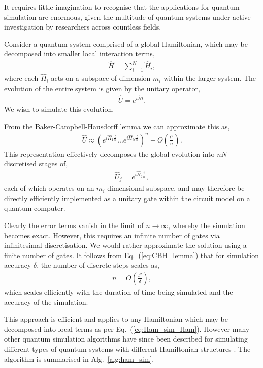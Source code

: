 It requires little imagination to recognise that the applications for quantum simulation are enormous, given the multitude of quantum systems under active investigation by researchers across countless fields.

Consider a quantum system comprised of a global Hamiltonian, which may be decomposed into smaller local interaction terms,
\begin{align} \label{eq:Ham_sim_Ham}
\hat{H} = \sum_{i=1}^N \hat{H}_i	,
\end{align}
where each $\hat{H}_i$ acts on a subspace of dimension $m_i$ within the larger system. The evolution of the entire system is given by the unitary operator,
\begin{align}
\hat{U} = e^{i\hat{H}t}.
\end{align}
We wish to simulate this evolution.

From the Baker-Campbell-Hausdorff lemma we can approximate this as,
\begin{align}\label{eq:CBH_lemma}
	\hat{U} \approx \left(e^{i\hat{H}_1\frac{t}{n}}\dots e^{i\hat{H}_N\frac{t}{n}}\right)^n + O\left(\frac{t^2}{n}\right).
\end{align}
This representation effectively decomposes the global evolution into $nN$ discretised stages of,
\begin{align}
	\hat{U}_j = e^{i\hat{H}_j\frac{t}{n}},
\end{align}
each of which operates on an $m_i$-dimensional subspace, and may therefore be directly efficiently implemented as a unitary gate within the circuit model on a quantum computer. 

Clearly the error terms vanish in the limit of \mbox{$n\to\infty$}, whereby the simulation becomes exact. However, this requires an infinite number of gates via infinitesimal discretisation. We would rather approximate the solution using a finite number of gates. It follows from Eq.~(\ref{eq:CBH_lemma}) that for simulation accuracy $\delta$, the number of discrete steps scales as,
\begin{align}
n = O\left(\frac{t^2}{\delta}\right),
\end{align}
which scales efficiently with the duration of time being simulated and the accuracy of the simulation.

This approach is efficient and applies to any Hamiltonian which may be decomposed into local terms as per Eq.~(\ref{eq:Ham_sim_Ham}). However many other quantum simulation algorithms have since been described for simulating different types of quantum systems with different Hamiltonian structures \cite{bib:JLP, bib:RohdeWavelet15}. The algorithm is summarised in Alg.~\ref{alg:ham_sim}.

